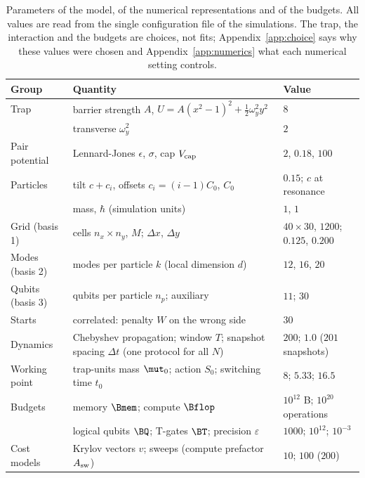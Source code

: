 \begin{table}[ht]
\centering
\small
\caption{Parameters of the model, of the numerical representations and of the budgets. All values are read from the single configuration file of the simulations. The trap, the interaction and the budgets are choices, not fits; Appendix~\ref{app:choice} says why these values were chosen and Appendix~\ref{app:numerics} what each numerical setting controls.}
\label{tab:params}
\begin{tabular}{L{2.4cm}L{7.4cm}L{4.4cm}}
\toprule
Group & Quantity & Value \\
\midrule
Trap & barrier strength $A$, $U=A(x^2-1)^2+\tfrac12\omega_y^2y^2$ & $8$ \\
 & transverse $\omega_y^2$ & $2$ \\
Pair potential & Lennard-Jones $\epsilon$, $\sigma$, cap $V_{\rm cap}$ & $2$, $0.18$, $100$ \\
Particles & tilt $c+c_i$, offsets $c_i=(i-1)C_0$, $C_0$ & $0.15$; $c$ at resonance \\
 & mass, $\hbar$ (simulation units) & $1$, $1$ \\
Grid (basis 1) & cells $n_x\times n_y$, $M$; $\Delta x$, $\Delta y$ & $40\times30$, $1200$; $0.125$, $0.200$ \\
Modes (basis 2) & modes per particle $k$ (local dimension $d$) & $12$, $16$, $20$ \\
Qubits (basis 3) & qubits per particle $n_p$; auxiliary & $11$; $30$ \\
Starts & correlated: penalty $W$ on the wrong side & $30$ \\
Dynamics & Chebyshev propagation; window $T$; snapshot spacing $\Delta t$ (one protocol for all $N$) & $200$; $1.0$ ($201$ snapshots) \\
Working point & trap-units mass $\mut_0$; action $S_0$; switching time $t_0$ & $8$; $5.33$; $16.5$ \\
Budgets & memory $\Bmem$; compute $\Bflop$ & $\ensuremath{10^{12}}$ B; $\ensuremath{10^{20}}$ operations \\
 & logical qubits $\BQ$; T-gates $\BT$; precision $\varepsilon$ & $1000$; $\ensuremath{10^{12}}$; $\ensuremath{10^{-3}}$ \\
Cost models & Krylov vectors $v$; sweeps (compute prefactor $A_{\rm sw}$) & $10$; $100$ ($200$) \\
\bottomrule
\end{tabular}
\end{table}
